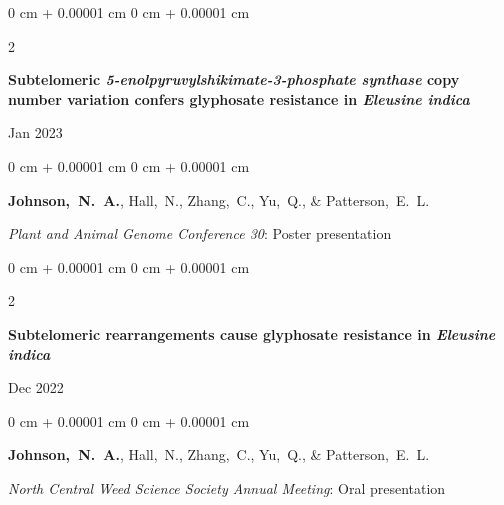 \documentclass[10pt, letterpaper]{article}
\newenvironment{onecolentry}{
    \begin{adjustwidth}{
        0 cm + 0.00001 cm
    }{
        0 cm + 0.00001 cm
    }
}{
    \end{adjustwidth}
} %
\newenvironment{twocolentry}[2][]{
    \onecolentry
    \def\secondColumn{#2}
    \setcolumnwidth{\fill, 4.5 cm}
    \begin{paracol}{2}
}{
    \switchcolumn \raggedleft \secondColumn
    \end{paracol}
    \endonecolentry
} %
\begin{document}
        \begin{samepage}
            \begin{twocolentry}{
                Jan 2023
            }
                \textbf{Subtelomeric \textit{5-enolpyruvylshikimate-3-phosphate synthase} copy number variation confers glyphosate resistance in \textit{Eleusine indica}}
            \end{twocolentry}

            \vspace{0.10 cm}
            
            \begin{onecolentry}
                \mbox{\textbf{Johnson, N. A.}}, \mbox{Hall, N.}, \mbox{Zhang, C.}, \mbox{Yu, Q.}, \& \mbox{Patterson, E. L.}

                \vspace{0.10 cm}
                
                \textit{Plant and Animal Genome Conference 30}: Poster presentation
            \end{onecolentry}
        \end{samepage}   


        \vspace{0.2 cm}
        

        \begin{samepage}
            \begin{twocolentry}{
                Dec 2022
            }
                \textbf{Subtelomeric rearrangements cause glyphosate resistance in \textit{Eleusine indica}}
            \end{twocolentry}

            \vspace{0.10 cm}
            
            \begin{onecolentry}
                \mbox{\textbf{Johnson, N. A.}}, \mbox{Hall, N.}, \mbox{Zhang, C.}, \mbox{Yu, Q.}, \& \mbox{Patterson, E. L.}

                \vspace{0.10 cm}
                
                \textit{North Central Weed Science Society Annual Meeting}: Oral presentation
            \end{onecolentry}
        \end{samepage}              

       
        
\end{document}
